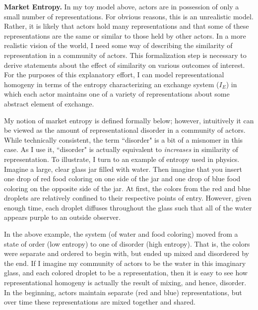 \textbf{Market Entropy.}
In my toy model above, actors are in possession of only a small number of representations. For obvious reasons, this is an unrealistic model. Rather, it is likely that actors hold many representations and that some of these representations are the same or similar to those held by other actors. In a more realistic vision of the world, I need some way of describing the similarity of representation in a community of actors. This formalization step is necessary to derive statements about the effect of similarity on various outcomes of interest. For the purposes of this explanatory effort, I can model representational homogeny in terms of the entropy characterizing an exchange system ($I_E$) in which each actor maintains one of a variety of representations about some abstract element of exchange.  
 
My notion of market entropy is defined formally below; however, intuitively it can be viewed as the amount of representational disorder in a community of actors. While technically consistent, the term ``disorder" is a bit of a misnomer in this case. As I use it, ``disorder" is actually equivalent to \emph{increases} in similarity of representation. To illustrate, I turn to an example of entropy used in physics. Imagine a large, clear glass jar filled with water. Then imagine that you insert one drop of red food coloring on one side of the jar and one drop of blue food coloring on the opposite side of the jar. At first, the colors from the red and blue droplets are relatively confined to their respective points of entry. However, given enough time, each droplet diffuses throughout the glass such that all of the water appears purple to an outside observer. 
 
In the above example, the system (of water and food coloring) moved from a state of order (low entropy) to one of disorder (high entropy). That is, the colors were separate and ordered to begin with, but ended up mixed and disordered by the end. If I imagine my community of actors to be the water in this imaginary glass, and each colored droplet to be a representation, then it is easy to see how representational homogeny is actually the result of mixing, and hence, disorder. In the beginning, actors maintain separate (red and blue) representations, but over time these representations are mixed together and shared.
 
